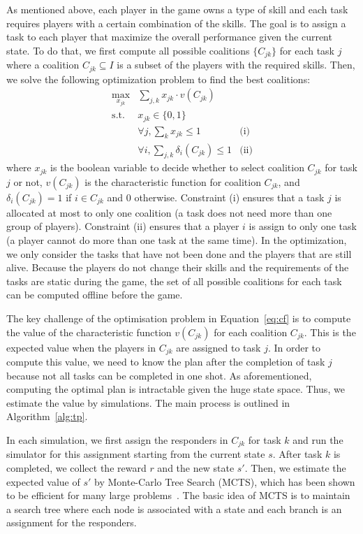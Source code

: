 As mentioned above, each player in the game owns a type of skill
and each task requires players with a certain combination of the
skills. The goal is to assign a task to each player that maximize
the overall performance given the current state. To do that, we
first compute all possible coalitions $\{ C_{jk} \}$ for each task
$j$ where a coalition $C_{jk} \subseteq I$ is a subset of the
players with the required skills. Then, we solve the following
optimization problem to find the best coalitions:
\begin{equation}
  \begin{array}{lll}
    \max_{x_{jk}} & \sum_{j, k} x_{jk} \cdot v(C_{jk}) & \\
    \mbox{s.t.} & x_{jk} \in \{0, 1\} & \\
    & \forall j, \sum_{k} x_{jk} \leq 1 & \mbox{(i)} \\
    & \forall i, \sum_{j, k} \delta_i(C_{jk}) \leq 1 & \mbox{(ii)}
  \end{array}
  \label{eq:cf}
\end{equation}
where $x_{jk}$ is the boolean variable to decide whether to select
coalition $C_{jk}$ for task $j$ or not, $v(C_{jk})$ is the
characteristic function for coalition $C_{jk}$, and
$\delta_i(C_{jk}) = 1$ if $i\in C_{jk}$ and 0 otherwise. Constraint
(i) ensures that a task $j$ is allocated at most to only one
coalition (a task does not need more than one group of players).
Constraint (ii) ensures that a player $i$ is assign to only one
task (a player cannot do more than one task at the same time). In
the optimization, we only consider the tasks that have not been
done and the players that are still alive. Because the players do
not change their skills and the requirements of the tasks are
static during the game, the set of all possible coalitions for each
task can be computed offline before the game.

The key challenge of the optimisation problem in
Equation~\ref{eq:cf} is to compute the value of the characteristic
function $v(C_{jk})$ for each coalition $C_{jk}$. This is the
expected value when the players in $C_{jk}$ are assigned to task
$j$. In order to compute this value, we need to know the plan after
the completion of task $j$ because not all tasks can be completed
in one shot. As aforementioned, computing the optimal plan is
intractable given the huge state space. Thus, we estimate the value
by simulations. The main process is outlined in
Algorithm~\ref{alg:tp}.

In each simulation, we first assign the responders in $C_{jk}$ for
task $k$ and run the simulator for this assignment starting from
the current state $s$. After task $k$ is completed, we collect the
reward $r$ and the new state $s'$. Then, we estimate the expected
value of $s'$ by Monte-Carlo Tree Search (MCTS), which has been
shown to be efficient for many large problems~\cite{?}. The basic
idea of MCTS is to maintain a search tree where each node is
associated with a state and each branch is an assignment for the
responders.

